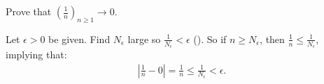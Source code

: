     \begin{example}
        Prove that $\left(\frac{1}{n}\right)_{n\geq 1} \rightarrow 0$.
    \end{example}
    \begin{solution}
        Let $\epsilon > 0$ be given. Find $N_\epsilon$ large so $\frac{1}{N_\epsilon} < \epsilon$ (). So if $n \geq N_\epsilon$, then $\frac{1}{n} \leq \frac{1}{N_\epsilon}$, implying that:
            \begin{equation*}
            \begin{split}
                \left|\frac{1}{n} - 0\right| = \frac{1}{n} \leq \frac{1}{N_\epsilon} < \epsilon.
            \end{split}
            \end{equation*}
    \end{solution}

